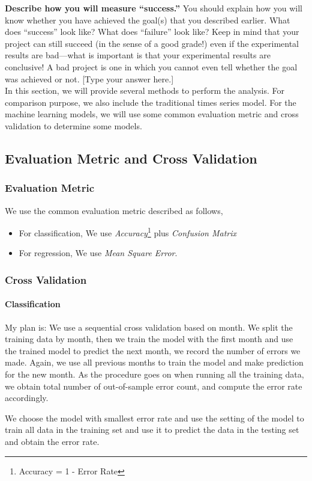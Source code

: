 \documentclass[a4paper,11pt]{article}
\begin{document}
\textbf{Describe how you will measure “success.”} You should explain how you will know whether you have achieved the goal(s) that you described earlier. What does “success” look like? What does “failure” look like? Keep in mind that your project can still succeed (in the sense of a good grade!) even if the experimental results are bad—what is important is that your experimental results are conclusive! A bad project is one in which you cannot even tell whether the goal was achieved or not. 
[Type your answer here.]
\\

In this section, we will provide several methods to perform the analysis. For comparison purpose, we also include the traditional times series model. For the machine learning models, we will use some common evaluation metric and cross validation to determine some models.
\subsection{Evaluation Metric and Cross Validation}

\subsubsection{Evaluation Metric}
We use the common evaluation metric described as follows,
\begin{itemize}
\item For classification, We use \emph{Accuracy}\footnote{Accuracy = 1 -  Error Rate} plus \emph{Confusion Matrix}
\item For regression, We use \emph{Mean Square Error}.
\end{itemize}
\subsubsection{Cross Validation}
\paragraph{Classification} My plan is:  We use a sequential cross validation based on month. We split the training data by month, then we train the model with the first month and use the trained model to predict the next month, we record the number of errors we made. Again, we use all previous months to train the model and make prediction for the new month. As the procedure goes on when running all the training data, we obtain total number of out-of-sample error count, and compute the error rate accordingly. \par
We choose the model with smallest error rate and use the setting of the model to train all data in the training set and use it to predict the data in the testing set and obtain the error rate. \par
\end{document}

